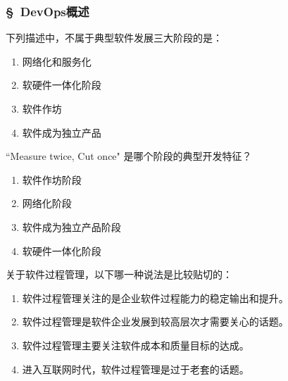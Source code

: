 \subsubsection*{\S\ DevOps概述}
\setcounter{problemname}{0}

\begin{problem}
	下列描述中，不属于典型软件发展三大阶段的是：
    \vspace{-0.8em}
    \begin{multicols}{4}
        \begin{enumerate}[label=\Alph*.]
            \item 网络化和服务化
            \item 软硬件一体化阶段
            \item 软件作坊
            \item 软件成为独立产品
        \end{enumerate}
    \end{multicols}
    \vspace{-1em}
\end{problem}



\begin{problem}
    ``Measure twice, Cut once" 是哪个阶段的典型开发特征？
    \vspace{-0.8em}
    \begin{multicols}{2}
        \begin{enumerate}[label=\Alph*.]
            \item 软件作坊阶段
            \item 网络化阶段
            \item 软件成为独立产品阶段
            \item 软硬件一体化阶段
        \end{enumerate}
    \end{multicols}
    \vspace{-1em}
\end{problem}



\begin{problem}
    关于软件过程管理，以下哪一种说法是比较贴切的：
        \begin{enumerate}[label=\Alph*.]
            \item 软件过程管理关注的是企业软件过程能力的稳定输出和提升。
            \item 软件过程管理是软件企业发展到较高层次才需要关心的话题。
            \item 软件过程管理主要关注软件成本和质量目标的达成。
            \item 进入互联网时代，软件过程管理是过于老套的话题。
        \end{enumerate}
\end{problem}



